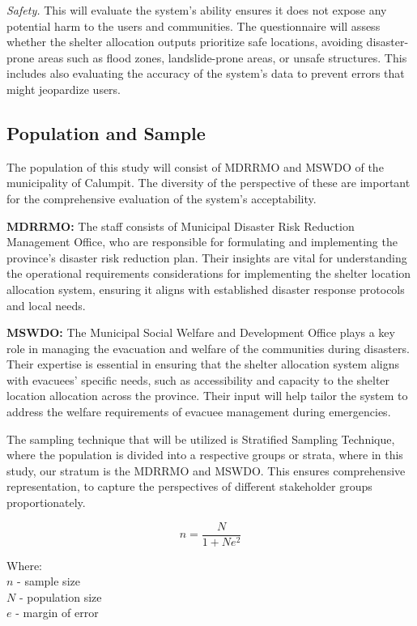 	\textit{Safety.} This will evaluate the system's ability ensures it does not expose any potential harm to the users and communities. The questionnaire will assess whether the shelter allocation outputs prioritize safe locations, avoiding disaster-prone areas such as flood zones, landslide-prone areas, or unsafe structures. This includes also evaluating the accuracy of the system's data to prevent errors that might jeopardize users.

\subsection{Population and Sample}
	The population of this study will consist of MDRRMO and MSWDO of the municipality of Calumpit. The diversity of the perspective of these are important for the comprehensive evaluation of the system’s acceptability.
	
	\textbf{MDRRMO:} The staff consists of Municipal Disaster Risk Reduction Management Office, who are responsible for formulating and implementing the province's disaster risk reduction plan.  Their insights are vital for understanding the operational requirements considerations for implementing the shelter location allocation system, ensuring it aligns with established disaster response protocols and local needs.
	
	\textbf{MSWDO:} The Municipal Social Welfare and Development Office plays a key role in managing the evacuation and welfare of the communities during disasters. Their expertise is essential in ensuring that the shelter allocation system aligns with evacuees' specific needs, such as accessibility and capacity to the shelter location allocation across the province. Their input will help tailor the system to address the welfare requirements of evacuee management during emergencies.
	
	The sampling technique that will be utilized is Stratified Sampling Technique, where the population is divided into a respective groups or strata, where in this study, our stratum is the MDRRMO and MSWDO. This ensures comprehensive representation, to capture the perspectives of different stakeholder groups proportionately.
	
	\begin{equation} 
		\label{slovin}
		n = \frac{N}{1+Ne^2}
	\end{equation}
	
	Where:
	\\$n$ - sample size
	\\$N$ - population size
	\\$e$ - margin of error
 	
